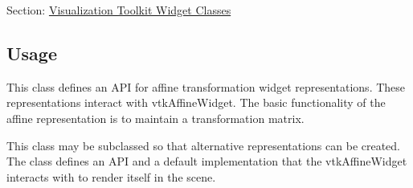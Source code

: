 Section\-: \hyperlink{sec_vtkwidgets}{Visualization Toolkit Widget Classes} \hypertarget{vtkwidgets_vtkxyplotwidget_Usage}{}\subsection{Usage}\label{vtkwidgets_vtkxyplotwidget_Usage}
This class defines an A\-P\-I for affine transformation widget representations. These representations interact with vtk\-Affine\-Widget. The basic functionality of the affine representation is to maintain a transformation matrix.

This class may be subclassed so that alternative representations can be created. The class defines an A\-P\-I and a default implementation that the vtk\-Affine\-Widget interacts with to render itself in the scene.

